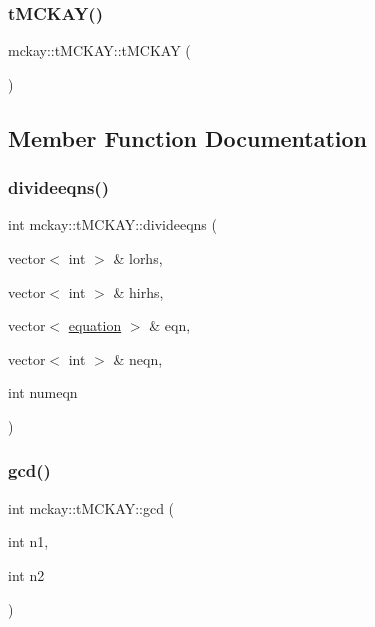 \subsubsection{\texorpdfstring{t\+M\+C\+K\+A\+Y()}{tMCKAY()}}
{\footnotesize\ttfamily mckay\+::t\+M\+C\+K\+A\+Y\+::t\+M\+C\+K\+AY (\begin{DoxyParamCaption}{ }\end{DoxyParamCaption})}



\subsection{Member Function Documentation}
\mbox{\label{classmckay_1_1t_m_c_k_a_y_a5083695703cb202b7c97f78990093316}} 
\subsubsection{\texorpdfstring{divideeqns()}{divideeqns()}}
{\footnotesize\ttfamily int mckay\+::t\+M\+C\+K\+A\+Y\+::divideeqns (\begin{DoxyParamCaption}\item[{vector$<$ int $>$ \&}]{lorhs,  }\item[{vector$<$ int $>$ \&}]{hirhs,  }\item[{vector$<$ \mbox{\hyperlink{namespacemckay_a4f7cb66ed07fe573b2b08e73ab462c1a}{equation}} $>$ \&}]{eqn,  }\item[{vector$<$ int $>$ \&}]{neqn,  }\item[{int}]{numeqn }\end{DoxyParamCaption})\hspace{0.3cm}{\ttfamily [protected]}}

\mbox{\label{classmckay_1_1t_m_c_k_a_y_aa021019054cebdfddbdb9e2c18a17635}} 
\subsubsection{\texorpdfstring{gcd()}{gcd()}}
{\footnotesize\ttfamily int mckay\+::t\+M\+C\+K\+A\+Y\+::gcd (\begin{DoxyParamCaption}\item[{int}]{n1,  }\item[{int}]{n2 }\end{DoxyParamCaption})\hspace{0.3cm}{\ttfamily [protected]}}

